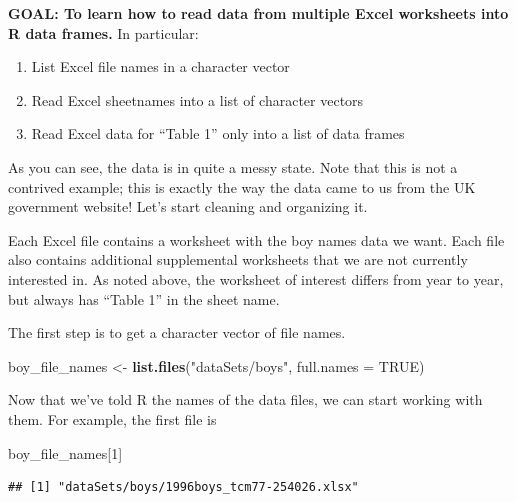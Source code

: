 \documentclass[
]{book}
\newenvironment{Shaded}{\begin{snugshade}}{\end{snugshade}}
\newcommand{\DataTypeTok}[1]{\textcolor[rgb]{0.13,0.29,0.53}{#1}}
\newcommand{\DecValTok}[1]{\textcolor[rgb]{0.00,0.00,0.81}{#1}}
\newcommand{\KeywordTok}[1]{\textcolor[rgb]{0.13,0.29,0.53}{\textbf{#1}}}
\newcommand{\NormalTok}[1]{#1}
\newcommand{\OtherTok}[1]{\textcolor[rgb]{0.56,0.35,0.01}{#1}}
\newcommand{\StringTok}[1]{\textcolor[rgb]{0.31,0.60,0.02}{#1}}
\providecommand{\tightlist}{%
  \setlength{\itemsep}{0pt}\setlength{\parskip}{0pt}}
\begin{document}
\begin{alert}

\textbf{GOAL: To learn how to read data from multiple Excel worksheets into R data frames.} In particular:

\begin{enumerate}
\def\labelenumi{\arabic{enumi}.}
\tightlist
\item
  List Excel file names in a character vector
\item
  Read Excel sheetnames into a list of character vectors
\item
  Read Excel data for ``Table 1'' only into a list of data frames
\end{enumerate}

\end{alert}

As you can see, the data is in quite a messy state. Note that this is
not a contrived example; this is exactly the way the data came to us
from the UK government website! Let's start cleaning and organizing
it.

Each Excel file contains a worksheet with the boy names data we want.
Each file also contains additional supplemental worksheets that we are
not currently interested in. As noted above, the worksheet of interest
differs from year to year, but always has ``Table 1'' in the sheet name.

The first step is to get a character vector of file names.

\begin{Shaded}
\begin{Highlighting}[]
\NormalTok{boy\_file\_names \textless{}{-}}\StringTok{ }\KeywordTok{list.files}\NormalTok{(}\StringTok{"dataSets/boys"}\NormalTok{, }\DataTypeTok{full.names =} \OtherTok{TRUE}\NormalTok{)}
\end{Highlighting}
\end{Shaded}

Now that we've told R the names of the data files, we can start working
with them. For example, the first file is

\begin{Shaded}
\begin{Highlighting}[]
\NormalTok{boy\_file\_names[}\DecValTok{1}\NormalTok{]}
\end{Highlighting}
\end{Shaded}

\begin{verbatim}
## [1] "dataSets/boys/1996boys_tcm77-254026.xlsx"
\end{verbatim}
\end{document}
